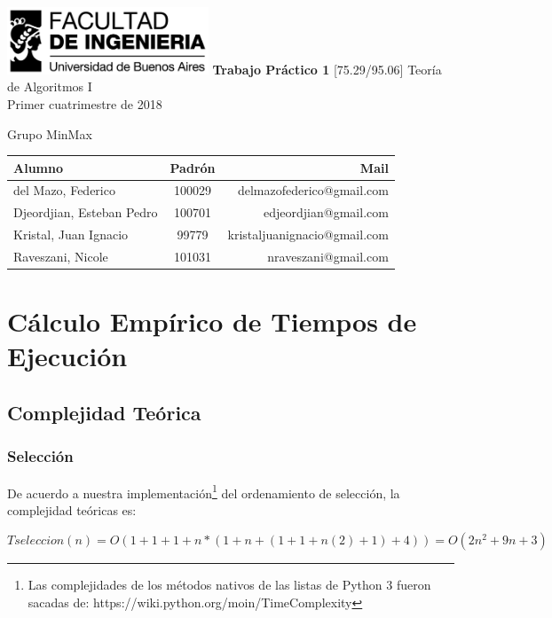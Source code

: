 \documentclass[article,a4paper]{article}
\begin{document}
\begin{titlepage}
	\hfill\includegraphics[width=6cm]{fiuba.jpg}
    \centering
    \vfill
    \Huge \textbf{Trabajo Práctico 1}
    \vskip2cm
    \Large [75.29/95.06] Teoría de Algoritmos I\\
    Primer cuatrimestre de 2018
    \vfill
    \begin{flushleft}
    Grupo MinMax
    \end{flushleft}
    \begin{tabular}{|l|c|r|}
	\hline
	Alumno & Padrón & Mail\\
	\hline
	\hline
	del Mazo, Federico & 100029 & delmazofederico@gmail.com\\
	\hline
    Djeordjian, Esteban Pedro & 100701 & edjeordjian@gmail.com\\	
	\hline
	Kristal, Juan Ignacio & 99779 & kristaljuanignacio@gmail.com\\
	\hline
    Raveszani, Nicole & 101031 & nraveszani@gmail.com\\
	\hline
	\end{tabular}
    \vfill
    \vfill
\end{titlepage}

\tableofcontents
\newpage
{}
\setcounter{page}{1}

\section{Cálculo Empírico de Tiempos de Ejecución}
\subsection{Complejidad Teórica}
\subsubsection{Selección}

De acuerdo a nuestra implementación\footnote{Las complejidades de los métodos nativos de las listas de Python 3 fueron sacadas de: https://wiki.python.org/moin/TimeComplexity} del ordenamiento de selección, la complejidad teóricas es:

$T seleccion(n) = O(1 + 1 + 1 + n * (1 + n + (1 + 1 + n (2) + 1)  + 4 ) ) = O(2n^2 + 9n + 3)$\\
\end{document}
